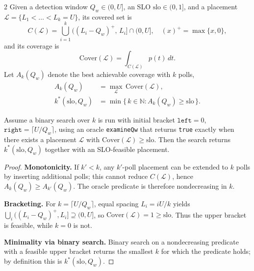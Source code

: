 \begin{reptheorem}{2}
Given a detection window $Q_w\in(0,U]$, an SLO $\text{slo}\in(0,1]$, and
a placement $\mathcal{L}=\{L_1<\dots<L_k=U\}$, its covered set is
\[
C(\mathcal{L})=\bigcup_{i=1}^{k}\big((L_i-Q_w)^+,\,L_i\big]\cap(0,U],
\quad (x)^+=\max\{x,0\},
\]
and its coverage is
\[
\mathrm{Cover}(\mathcal{L})=\int_{C(\mathcal{L})}\!p(t)\,dt.
\]
Let $A_k(Q_w)$ denote the best achievable coverage with $k$ polls,
\[
\begin{aligned}
A_k(Q_w) &= \max_{\mathcal{L}}\, \mathrm{Cover}(\mathcal{L}),\\
k^*(\text{slo},Q_w) &= \min\{\,k\in\mathbb{N}: A_k(Q_w)\ge \text{slo}\,\}.
\end{aligned}
\]

Assume a binary search over $k$ is run with initial bracket $\texttt{left}=0$, $\texttt{right}=\lceil U/Q_w\rceil$,
using an oracle \texttt{examineQw} that returns \texttt{true} exactly when there exists a placement $\mathcal{L}$ with $\mathrm{Cover}(\mathcal{L})\ge \text{slo}$.
Then the search returns $k^*(\text{slo},Q_w)$ together with an SLO-feasible placement.
\end{reptheorem}

\begin{proof}
\noindent\textbf{Monotonicity.} If $k'<k$, any $k'$-poll placement can be extended to $k$ polls by inserting additional polls; this cannot reduce $C(\mathcal{L})$, hence $A_k(Q_w)\ge A_{k'}(Q_w)$. The oracle predicate is therefore nondecreasing in $k$.

\noindent\textbf{Bracketing.} For $k=\lceil U/Q_w\rceil$, equal spacing $L_i=iU/k$ yields $\bigcup_i ((L_i-Q_w)^+,L_i]\supseteq(0,U]$, so $\mathrm{Cover}(\mathcal{L})=1\ge \text{slo}$. Thus the upper bracket is feasible, while $k=0$ is not.

\noindent\textbf{Minimality via binary search.} Binary search on a nondecreasing predicate with a feasible upper bracket returns the smallest $k$ for which the predicate holds; by definition this is $k^*(\text{slo},Q_w)$.
\end{proof}